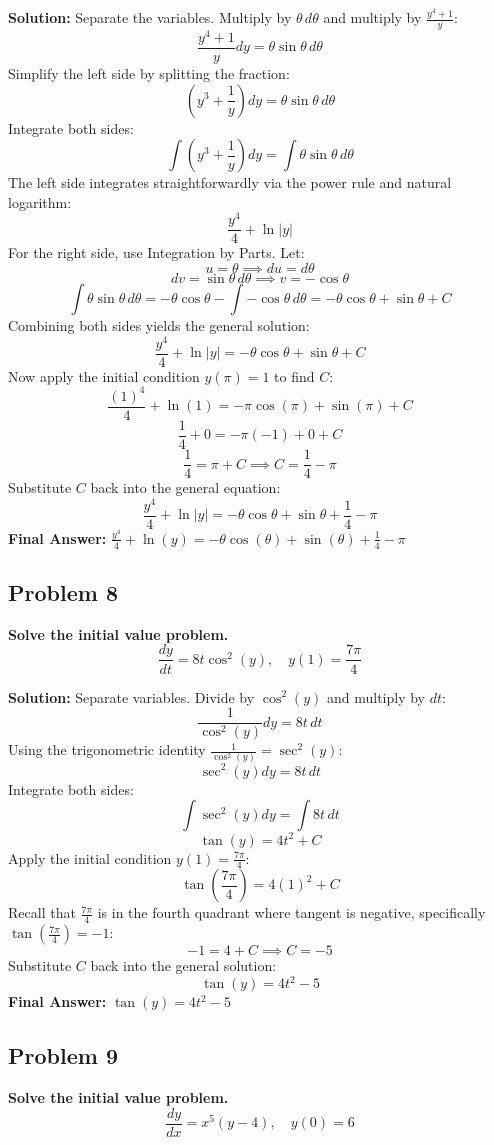 \documentclass[11pt]{article}
\begin{document}
\textbf{Solution:}
Separate the variables. Multiply by $\theta \, d\theta$ and multiply by $\frac{y^4+1}{y}$:
\[ \frac{y^4+1}{y} dy = \theta \sin\theta \, d\theta \]
Simplify the left side by splitting the fraction:
\[ \left( y^3 + \frac{1}{y} \right) dy = \theta \sin\theta \, d\theta \]
Integrate both sides:
\[ \int \left( y^3 + \frac{1}{y} \right) dy = \int \theta \sin\theta \, d\theta \]
The left side integrates straightforwardly via the power rule and natural logarithm:
\[ \frac{y^4}{4} + \ln|y| \]
For the right side, use Integration by Parts. Let:
\[ u = \theta \implies du = d\theta \]
\[ dv = \sin\theta \, d\theta \implies v = -\cos\theta \]
\[ \int \theta \sin\theta \, d\theta = -\theta \cos\theta - \int -\cos\theta \, d\theta = -\theta \cos\theta + \sin\theta + C \]
Combining both sides yields the general solution:
\[ \frac{y^4}{4} + \ln|y| = -\theta \cos\theta + \sin\theta + C \]
Now apply the initial condition $y(\pi) = 1$ to find $C$:
\[ \frac{(1)^4}{4} + \ln(1) = -\pi \cos(\pi) + \sin(\pi) + C \]
\[ \frac{1}{4} + 0 = -\pi(-1) + 0 + C \]
\[ \frac{1}{4} = \pi + C \implies C = \frac{1}{4} - \pi \]
Substitute $C$ back into the general equation:
\[ \frac{y^4}{4} + \ln|y| = -\theta \cos\theta + \sin\theta + \frac{1}{4} - \pi \]
\textbf{Final Answer:} \textbf{$\frac{y^4}{4} + \ln(y) = -\theta \cos(\theta) + \sin(\theta) + \frac{1}{4} - \pi$}

\vspace{0.5cm}
\subsection*{Problem 8}
\textbf{Solve the initial value problem.}
\[ \frac{dy}{dt} = 8t \cos^2(y), \quad y(1) = \frac{7\pi}{4} \]

\textbf{Solution:}
Separate variables. Divide by $\cos^2(y)$ and multiply by $dt$:
\[ \frac{1}{\cos^2(y)} dy = 8t \, dt \]
Using the trigonometric identity $\frac{1}{\cos^2(y)} = \sec^2(y)$:
\[ \sec^2(y) dy = 8t \, dt \]
Integrate both sides:
\[ \int \sec^2(y) dy = \int 8t \, dt \]
\[ \tan(y) = 4t^2 + C \]
Apply the initial condition $y(1) = \frac{7\pi}{4}$:
\[ \tan\left(\frac{7\pi}{4}\right) = 4(1)^2 + C \]
Recall that $\frac{7\pi}{4}$ is in the fourth quadrant where tangent is negative, specifically $\tan(\frac{7\pi}{4}) = -1$:
\[ -1 = 4 + C \implies C = -5 \]
Substitute $C$ back into the general solution:
\[ \tan(y) = 4t^2 - 5 \]
\textbf{Final Answer:} \textbf{$\tan(y) = 4t^2 - 5$}

\vspace{0.5cm}
\subsection*{Problem 9}
\textbf{Solve the initial value problem.}
\[ \frac{dy}{dx} = x^5(y-4), \quad y(0) = 6 \]
\end{document}

